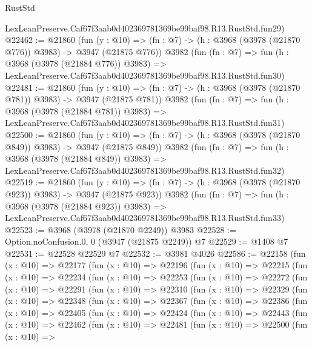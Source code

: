 \begin{lexlean}{RustStd}
\begin{coremodule}
    LexLeanPreserve.Caf67f3aab0d402369781369be99baf98.R13.RustStd.fun29)
@22462 := @21860
    (fun (y : @10) => (fn : @7) -> (h : @3968 (@3978 (@21870 @776)) @3983) -> @3947 (@21875 @776))
    @3982
    (fun (fn : @7) =>
    fun (h : @3968 (@3978 (@21884 @776)) @3983) =>
    LexLeanPreserve.Caf67f3aab0d402369781369be99baf98.R13.RustStd.fun30)
@22481 := @21860
    (fun (y : @10) => (fn : @7) -> (h : @3968 (@3978 (@21870 @781)) @3983) -> @3947 (@21875 @781))
    @3982
    (fun (fn : @7) =>
    fun (h : @3968 (@3978 (@21884 @781)) @3983) =>
    LexLeanPreserve.Caf67f3aab0d402369781369be99baf98.R13.RustStd.fun31)
@22500 := @21860
    (fun (y : @10) => (fn : @7) -> (h : @3968 (@3978 (@21870 @849)) @3983) -> @3947 (@21875 @849))
    @3982
    (fun (fn : @7) =>
    fun (h : @3968 (@3978 (@21884 @849)) @3983) =>
    LexLeanPreserve.Caf67f3aab0d402369781369be99baf98.R13.RustStd.fun32)
@22519 := @21860
    (fun (y : @10) => (fn : @7) -> (h : @3968 (@3978 (@21870 @923)) @3983) -> @3947 (@21875 @923))
    @3982
    (fun (fn : @7) =>
    fun (h : @3968 (@3978 (@21884 @923)) @3983) =>
    LexLeanPreserve.Caf67f3aab0d402369781369be99baf98.R13.RustStd.fun33)
@22523 := @3968 (@3978 (@21870 @2249)) @3983
@22528 := Option.noConfusion.{0, 0} (@3947 (@21875 @2249)) @7
@22529 := @1408 @7
@22531 := @22528 @22529 @7
@22532 := @3981 @4026
@22586 := @22158
    (fun (x : @10) =>
    @22177
      (fun (x : @10) =>
      @22196
        (fun (x : @10) =>
        @22215
          (fun (x : @10) =>
          @22234
            (fun (x : @10) =>
            @22253
              (fun (x : @10) =>
              @22272
                (fun (x : @10) =>
                @22291
                  (fun (x : @10) =>
                  @22310
                    (fun (x : @10) =>
                    @22329
                      (fun (x : @10) =>
                      @22348
                        (fun (x : @10) =>
                        @22367
                          (fun (x : @10) =>
                          @22386
                            (fun (x : @10) =>
                            @22405
                              (fun (x : @10) =>
                              @22424
                                (fun (x : @10) =>
                                @22443
                                  (fun (x : @10) =>
                                  @22462
                                    (fun (x : @10) =>
                                    @22481
                                      (fun (x : @10) =>
                                      @22500
                                        (fun (x : @10) =>

\end{coremodule}
\end{lexlean}
